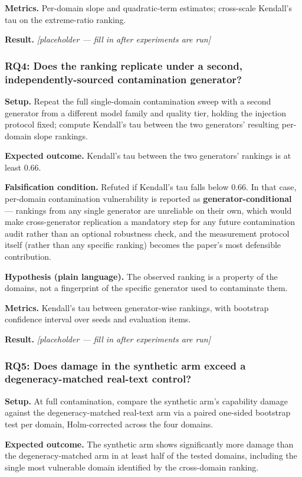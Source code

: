 \documentclass[11pt]{article}
\newcommand{\ph}{\textit{[placeholder --- fill in after experiments are run]}}
\begin{document}
\textbf{Metrics.} Per-domain slope and quadratic-term estimates; cross-scale Kendall's tau on the extreme-ratio ranking.

\textbf{Result.} \ph

\subsubsection{RQ4: Does the ranking replicate under a second, independently-sourced contamination generator?}
\textbf{Setup.} Repeat the full single-domain contamination sweep with a second generator from a different model family and quality tier, holding the injection protocol fixed; compute Kendall's tau between the two generators' resulting per-domain slope rankings.

\textbf{Expected outcome.} Kendall's tau between the two generators' rankings is at least 0.66.

\textbf{Falsification condition.} Refuted if Kendall's tau falls below 0.66. In that case, per-domain contamination vulnerability is reported as \textbf{generator-conditional} --- rankings from any single generator are unreliable on their own, which would make cross-generator replication a mandatory step for any future contamination audit rather than an optional robustness check, and the measurement protocol itself (rather than any specific ranking) becomes the paper's most defensible contribution.

\textbf{Hypothesis (plain language).} The observed ranking is a property of the domains, not a fingerprint of the specific generator used to contaminate them.

\textbf{Metrics.} Kendall's tau between generator-wise rankings, with bootstrap confidence interval over seeds and evaluation items.

\textbf{Result.} \ph

\subsubsection{RQ5: Does damage in the synthetic arm exceed a degeneracy-matched real-text control?}
\textbf{Setup.} At full contamination, compare the synthetic arm's capability damage against the degeneracy-matched real-text arm via a paired one-sided bootstrap test per domain, Holm-corrected across the four domains.

\textbf{Expected outcome.} The synthetic arm shows significantly more damage than the degeneracy-matched arm in at least half of the tested domains, including the single most vulnerable domain identified by the cross-domain ranking.
\end{document}
